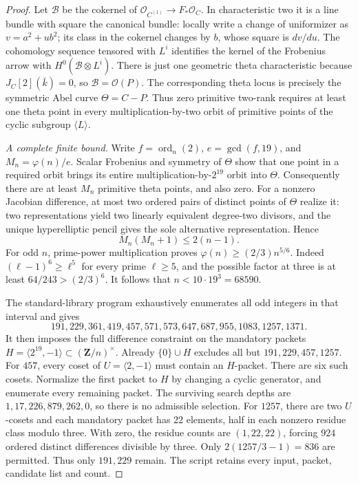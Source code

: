 \begin{proof}
Let $\mathcal B$ be the cokernel of
$\mathcal O_{C^{(1)}}\to F_*\mathcal O_C$. In characteristic two it
is a line bundle with square the canonical bundle: locally write
a change of uniformizer as $v=a^2+u b^2$; its class in the
cokernel changes by $b$, whose square is $dv/du$. The cohomology
sequence tensored with $L^i$ identifies the kernel of the
Frobenius arrow with $H^0(\mathcal B\otimes L^i)$.
There is just one geometric theta characteristic because
$J_C[2](\bar k)=0$, so $\mathcal B=\mathcal O(P)$.
The corresponding theta locus is precisely the symmetric Abel
curve $\Theta=C-P$. Thus zero primitive two-rank requires at
least one theta point in every multiplication-by-two orbit of
primitive points of the cyclic subgroup $\langle L\rangle$.

\emph{A complete finite bound.}
Write $f=\operatorname{ord}_n(2)$,
$e=\gcd(f,19)$, and $M_n=\varphi(n)/e$.
Scalar Frobenius and symmetry of $\Theta$ show that one point
in a required orbit brings its entire multiplication-by-$2^{19}$
orbit into $\Theta$. Consequently there are at least $M_n$
primitive theta points, and also zero. For a nonzero Jacobian
difference, at most two ordered pairs of distinct points of
$\Theta$ realize it: two representations yield two linearly
equivalent degree-two divisors, and the unique hyperelliptic
pencil gives the sole alternative representation. Hence
\[
 M_n(M_n+1)\le2(n-1).
\]
For odd $n$, prime-power multiplication proves
$\varphi(n)\ge(2/3)n^{5/6}$. Indeed
$(\ell-1)^6\ge\ell^5$ for every prime $\ell\ge5$, and the possible
factor at three is at least $64/243>(2/3)^6$.
It follows that $n<10\cdot19^3=68590$.

The standard-library program 
exhaustively enumerates all odd integers in that interval and gives
\[
191,229,361,419,457,571,573,647,687,955,1083,1257,1371.
\]
It then imposes the full difference constraint on the mandatory
packets $H=\langle 2^{19},-1\rangle\subset(\mathbf Z/n)^\times$.
Already $\{0\}\cup H$ excludes all but $191,229,457,1257$.
For $457$, every coset of $U=\langle2,-1\rangle$ must contain an
$H$-packet. There are six such cosets. Normalize the first packet
to $H$ by changing a cyclic generator, and enumerate every
remaining packet. The surviving search depths are
$1,17,226,879,262,0$, so there is no admissible selection.
For $1257$, there are two $U$-cosets and each mandatory packet
has 22 elements, half in each nonzero residue class modulo three.
With zero, the residue counts are $(1,22,22)$, forcing
$924$ ordered distinct differences divisible by three. Only
$2(1257/3-1)=836$ are permitted. Thus only $191,229$ remain.
The script retains every input, packet, candidate list and count.


\end{proof}
